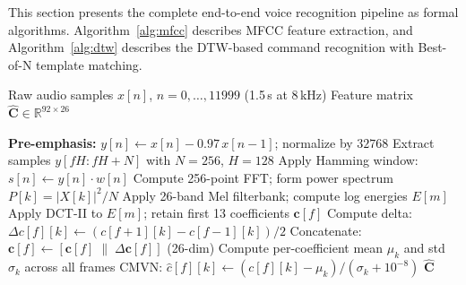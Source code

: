 \documentclass[conference]{IEEEtran}
\begin{document}
This section presents the complete end-to-end voice recognition pipeline as
formal algorithms. Algorithm~\ref{alg:mfcc} describes MFCC feature extraction,
and Algorithm~\ref{alg:dtw} describes the DTW-based command recognition with
Best-of-N template matching.
\begin{algorithm}[H]
\caption{MFCC Feature Extraction}
\label{alg:mfcc}
\begin{algorithmic}[1]
\REQUIRE Raw audio samples $x[n]$, $n=0,\ldots,11999$ (1.5\,s at 8\,kHz)
\ENSURE Feature matrix $\hat{\mathbf{C}} \in \mathbb{R}^{92 \times 26}$

\STATE \textbf{Pre-emphasis:} $y[n] \leftarrow x[n] - 0.97\,x[n-1]$; normalize by $32768$
  \STATE Extract samples $y[fH : fH+N]$ with $N=256$, $H=128$
  \STATE Apply Hamming window: $s[n] \leftarrow y[n]\cdot w[n]$
  \STATE Compute 256-point FFT; form power spectrum $P[k] = |X[k]|^2/N$
  \STATE Apply 26-band Mel filterbank; compute log energies $E[m]$
  \STATE Apply DCT-II to $E[m]$; retain first 13 coefficients $\mathbf{c}[f]$
\ENDFOR
{}
  \STATE Compute delta: $\Delta c[f][k] \leftarrow (c[f{+}1][k] - c[f{-}1][k])/2$
  \STATE Concatenate: $\mathbf{c}[f] \leftarrow [\mathbf{c}[f] \;\|\; \Delta\mathbf{c}[f]]$ (26-dim)
\ENDFOR
\STATE Compute per-coefficient mean $\mu_k$ and std $\sigma_k$ across all frames
\STATE CMVN: $\hat{c}[f][k] \leftarrow (c[f][k] - \mu_k)/(\sigma_k + 10^{-8})$
\RETURN $\hat{\mathbf{C}}$
\end{algorithmic}
\end{algorithm}
\vspace{-16pt}
\end{document}
